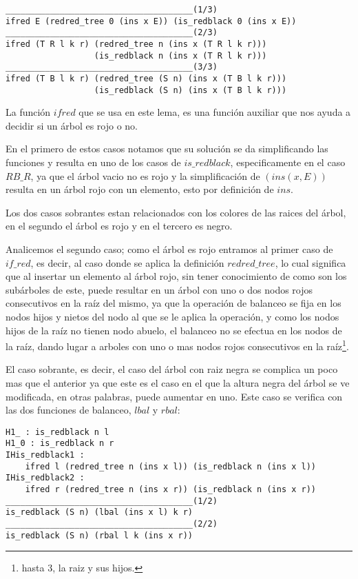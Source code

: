  \begin{verbatim}
______________________________________(1/3)
ifred E (redred_tree 0 (ins x E)) (is_redblack 0 (ins x E))
______________________________________(2/3)
ifred (T R l k r) (redred_tree n (ins x (T R l k r)))
                  (is_redblack n (ins x (T R l k r)))
______________________________________(3/3)
ifred (T B l k r) (redred_tree (S n) (ins x (T B l k r)))
                  (is_redblack (S n) (ins x (T B l k r)))
 \end{verbatim}

La funci\'on $ifred$ que se usa en este lema, es una funci\'on auxiliar que nos ayuda a decidir si
un \'arbol es rojo o no.

En el primero de estos casos notamos que su soluci\'on se da simplificando las funciones y resulta
en uno de los casos de $is\_redblack$, especificamente en el caso $RB\_R$, ya que el \'arbol vacio
no es rojo y la simplificaci\'on de $(ins(x,E))$ resulta en un \'arbol rojo con un elemento, esto
por definici\'on de $ins$.

Los dos casos sobrantes estan relacionados con los colores de las raices del \'arbol, en el
segundo el \'arbol es rojo y en el tercero es negro.

Analicemos el segundo caso; como el \'arbol es rojo entramos al primer caso de $if\_red$, es decir,
al caso donde se aplica la definici\'on $redred\_tree$, lo cual significa que al insertar un elemento al
\'arbol rojo, sin tener conocimiento de como son los subárboles de este, puede resultar en un
\'arbol con uno o dos nodos rojos consecutivos en la ra\'iz del mismo, ya que la operaci\'on de
balanceo se fija en los nodos hijos y nietos del nodo al que se le aplica la operaci\'on, y como
los nodos hijos de la raíz no tienen nodo abuelo, el balanceo no se efectua en los nodos
de la raíz, dando lugar a arboles con uno o mas nodos rojos consecutivos en la raíz\footnote{hasta 3, la raiz y
sus hijos.}.

El caso sobrante, es decir, el caso del \'arbol con raiz negra se
complica un poco mas que el anterior ya que este es el caso en el que la altura negra del \'arbol
se ve modificada, en otras palabras, puede aumentar en uno. Este caso se verifica con las dos funciones de balanceo, $lbal$ y $rbal$:

\begin{verbatim}
H1_ : is_redblack n l
H1_0 : is_redblack n r
IHis_redblack1 :
    ifred l (redred_tree n (ins x l)) (is_redblack n (ins x l))
IHis_redblack2 :
    ifred r (redred_tree n (ins x r)) (is_redblack n (ins x r))
______________________________________(1/2)
is_redblack (S n) (lbal (ins x l) k r)
______________________________________(2/2)
is_redblack (S n) (rbal l k (ins x r))
\end{verbatim}

